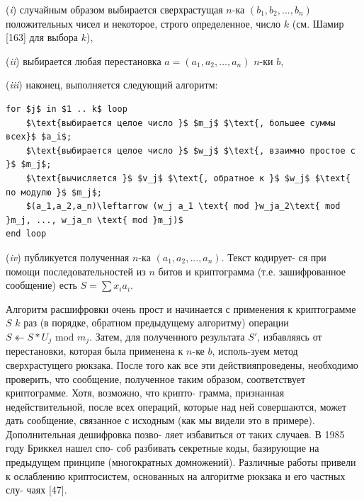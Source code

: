  
\par (\textit{i}) случайным образом выбирается сверхрастущая $n$-ка $(b_1,b_2,...,b_n)$\linebreak
положительных чисел и некоторое, строго определенное, число $k$\linebreak
\pagebreak
(см. Шамир [163] для выбора $k$),
\par  (\textit{ii}) выбирается любая перестановка $a = (a_1,a_2,...,a_n)$ $n$-ки $b$,
\par  (\textit{iii}) наконец, выполняется следующий алгоритм:
\begin{lstlisting}[mathescape=true]
for $j$ in $1 .. k$ loop
	$\text{выбирается целое число }$ $m_j$ $\text{, большее суммы всех}$ $a_i$;
	$\text{выбирается целое число }$ $w_j$ $\text{, взаимно простое с }$ $m_j$;
	$\text{вычисляется }$ $v_j$ $\text{, обратное к }$ $w_j$ $\text{ по модулю }$ $m_j$;
	$(a_1,a_2,a_n)\leftarrow (w_j a_1 \text{ mod }w_ja_2\text{ mod }m_j, ..., w_ja_n \text{ mod }m_j)$
end loop
\end{lstlisting}	
\normalsize \par  (\textit{iv}) публикуется полученная $n$-ка $(a_1,a_2,...,a_n)$. Текст кодирует­-\linebreak
ся при помощи последовательностей из $n$ битов и криптограмма (т.е.\linebreak
зашифрованное сообщение) есть $S = \sum x_i a_i$.

Алгоритм расшифровки очень прост и начинается с применения к\linebreak
криптограмме $S$ $k$ раз (в порядке, обратном предыдущему алгоритму)\linebreak
операции $S \twoheadleftarrow S * U_j \text{ mod } m_j$. Затем, для полученного результата $S'$,\linebreak
избавляясь от перестановки, которая была применена к $n$-ке $b$, исполь­-\linebreak зуем метод сверхрастущего рюкзака. После того как все эти действия\linebreak проведены, необходимо проверить, что сообщение, полученное таким\linebreak
образом, соответствует криптограмме. Хотя, возможно, что крипто­-\linebreak
грамма, признанная недействительной, после всех операций, которые\linebreak
над ней совершаются, может дать сообщение, связанное с исходным\linebreak
(как мы видели это в примере). Дополнительная дешифровка позво­-\linebreak
ляет избавиться от таких случаев. В 1985 году Бриккел нашел спо­-\linebreak
соб разбивать секретные коды, базирующие на предыдущем принципе\linebreak
(многократных домножений). Различные работы привели к ослаблению\linebreak
криптосистем, основанных на алгоритме рюкзака и его частных слу­-\linebreak
чаях [47].
